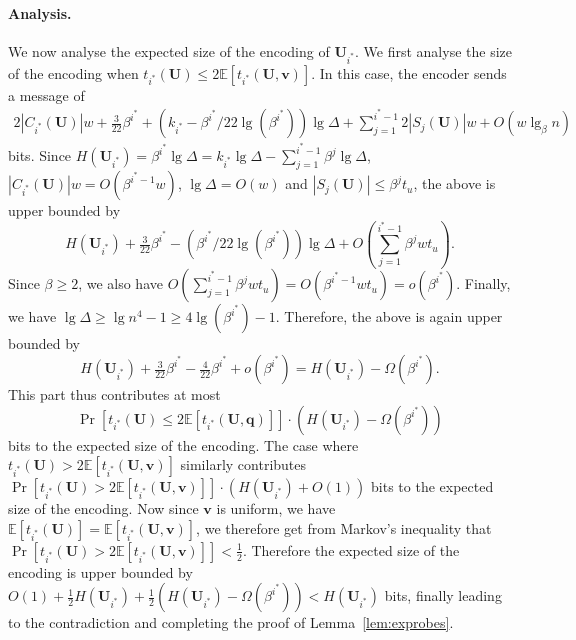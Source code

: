 \documentclass[letterpaper]{article}
\newcommand{\E}{\mathbb{E}}
\newcommand{\is}{{i^*}}
\newcommand{\U}{\textbf{U}}
\newcommand{\vs}{\textbf{v}}
\newcommand{\q}{\textbf{q}}
\begin{document}
\paragraph{Analysis.}
We now analyse the expected size of the encoding of
$\U_\is$. We first analyse the size of the encoding when
$t_\is(\U) \leq 2\E[t_\is(\U,\vs)]$. In this case, the encoder sends a
message of
\begin{eqnarray*}
2|C_\is(\U)|w+\tfrac{3}{22}\beta^\is+(k_\is-\beta^\is/22\lg(\beta^\is)) \lg
  \Delta
+\sum_{j=1}^{\is-1}2|S_j(\U)|w+O(w \lg_\beta n)
\end{eqnarray*}
bits. Since $H(\U_\is) = \beta^\is \lg \Delta = k_\is \lg \Delta -
\sum_{j=1}^{\is-1}\beta^j \lg \Delta$,
$|C_\is(\U)|w=O(\beta^{\is-1}w)$, $\lg \Delta = O(w)$ and $|S_j(\U)|
\leq \beta^j t_u$, the above is upper bounded by
\[
H(\U_\is)+\tfrac{3}{22}\beta^\is-(\beta^\is/22\lg(\beta^\is))\lg\Delta
+O\left(\sum_{j=1}^{\is-1}\beta^jwt_u\right). 
\]
Since $\beta \geq 2$, we also have $O\left(\sum_{j=1}^{\is-1} \beta^j
wt_u\right) = O\left(\beta^{\is-1} wt_u
\right)=o(\beta^\is)$. Finally, we have $\lg \Delta \geq \lg n^4-1 \geq 
4\lg(\beta^\is)-1$. Therefore, the above is again upper bounded by
\[
H(\U_\is)+\tfrac{3}{22}\beta^\is-\tfrac{4}{22}\beta^\is+o(\beta^\is)=H(\U_\is)-\Omega(\beta^{\is}).
\]
This part thus contributes at most
\[
\Pr[t_\is(\U) \leq 2 \E[t_\is(\U,\q)]] \cdot
(H(\U_\is)-\Omega(\beta^{\is}))
\]
bits to the expected size of the encoding. The case where
$t_\is(\U)>2\E[t_\is(\U,\vs)]$ similarly contributes $ \Pr[t_\is(\U) >
  2 \E[t_\is(\U,\vs)]] \cdot (H(\U_\is)+O(1)) $ bits to the expected
size of the encoding. Now since $\vs$ is uniform, we have
$\E[t_\is(\U)]=\E[t_\is(\U,\vs)]$, we therefore get from Markov's
inequality that $\Pr[t_\is(\U) > 2 \E[t_\is(\U,\vs)]]<\tfrac{1}{2}$.
Therefore the expected size of the encoding is upper bounded by $
O(1)+\tfrac{1}{2}H(\U_\is)+\tfrac{1}{2}(H(\U_\is)-\Omega(\beta^{\is}))
< H(\U_\is) $ bits, finally leading to the contradiction and
completing the proof of Lemma~\ref{lem:exprobes}.
\end{document}
